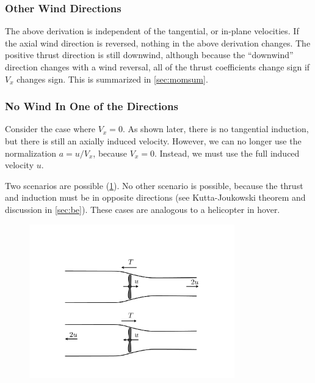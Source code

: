 \documentclass{article}
\begin{document}


\subsubsection{Other Wind Directions}

The above derivation is independent of the tangential, or in-plane velocities.  If the axial wind direction is reversed, nothing in the above derivation changes.  The positive thrust direction is still downwind, although because the ``downwind'' direction changes with a wind reversal, all of the thrust coefficients change sign if $V_x$ changes sign.  This is summarized in \cref{sec:momsum}.

\subsubsection{No Wind In One of the Directions}

Consider the case where $V_x = 0$.  As shown later, there is no tangential induction, but there is still an axially induced velocity.  However, we can no longer use the normalization $a = u/V_x$, because $V_x = 0$.  Instead, we must use the full induced velocity $u$.

Two scenarios are possible (\cref{fig:velocity-deficit2}).  No other scenario is possible, because the thrust and induction must be in opposite directions (see Kutta-Joukowski theorem and discussion in \cref{sec:be}).  These cases are analogous to a helicopter in hover.
\begin{figure}[htbp]
\centering
\includegraphics[width=3.5in]{figures/velocity-deficit2}
\caption{}
\label{fig:velocity-deficit2}
\end{figure}
\end{document}
